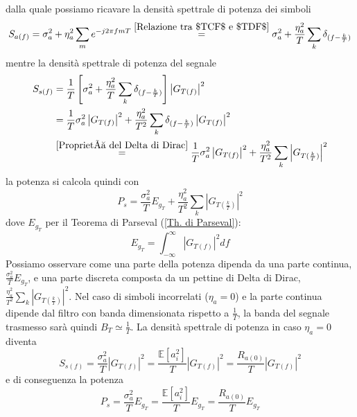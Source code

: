                 dalla quale possiamo ricavare la densità spettrale di potenza dei simboli
                \[
                    S_{a(f)} = \sigma_a^2 + \eta_a^2\sum_{m}e^{-j2\pi fmT} \overset{\ref{Relazione tra $TCF$ e $TDF$}}{=} \sigma_a^2 + \frac{\eta_a^2 }{T}\sum_{k} \delta_{(f-\frac{k}{T})}
                \]
                mentre la densità spettrale di potenza del segnale 
                \begin{align}
                    S_{s(f)} &= \frac{1}{T} \left[\sigma_a^2 + \frac{\eta_a^2 }{T}\sum_{k} \delta_{(f-\frac{k}{T})}\right]\left|G_{T(f)}\right|^2 \nonumber \\
                            &= \frac{1}{T} \sigma_a^2\left|G_{T(f)}\right|^2 + \frac{\eta_a^2 }{T^2}\sum_{k} \delta_{(f-\frac{k}{T})}\left|G_{T(f)}\right|^2\nonumber \\
                            &\overset{\ref{Proprietà del Delta di Dirac}}{=} \frac{1}{T} \sigma_a^2\left|G_{T(f)}\right|^2 + \frac{\eta_a^2 }{T^2}\sum_{k} \left|G_{T(\frac{k}{T})}\right|^2\nonumber
                \end{align}
                la potenza si calcola quindi con 
                \[
                    P_s  = \frac{\sigma_a^2}{T} E_{g_T} + \frac{\eta_a^2 }{T^2}\sum_{k} \left|G_{T(\frac{k}{T})}\right|^2
                \]
                dove $E_{g_T}$ per il Teorema di Parseval (\ref{Th. di Parseval}):
                \[
                    E_{g_T} = \int_{-\infty}^{\infty} \left|G_{T(f)}\right|^2 df 
                \]
                Possiamo osservare come una parte della potenza dipenda da una parte continua, $\frac{\sigma_a^2}{T} E_{g_T}$, e una parte discreta
                composta da un pettine di Delta di Dirac, $\frac{\eta_a^2 }{T^2}\sum_{k} \left|G_{T(\frac{k}{T})}\right|^2$. Nel caso di simboli incorrelati ($\eta_a = 0$)
                e la parte continua dipende dal filtro con banda dimensionata rispetto a $\frac{1}{T}$, la banda del segnale trasmesso sarà quindi $B_T \simeq \frac{1}{T}$. 
                La densità spettrale di potenza in caso $\eta_a = 0$ diventa
                \[
                    S_{s(f)} = \frac{\sigma_a^2}{T} \left|G_{T(f)}\right|^2 =  \frac{\mathbb{E}[a_i^2]}{T} \left|G_{T(f)}\right|^2 = \frac{R_{a(0)}}{T} \left|G_{T(f)}\right|^2
                \] \label{Potenza - PAM}
                e di conseguenza la potenza 
                \[
                    P_s  = \frac{\sigma_a^2}{T} E_{g_T} = \frac{\mathbb{E}[a_i^2]}{T} E_{g_T} = \frac{R_{a(0)}}{T} E_{g_T}
                \]
